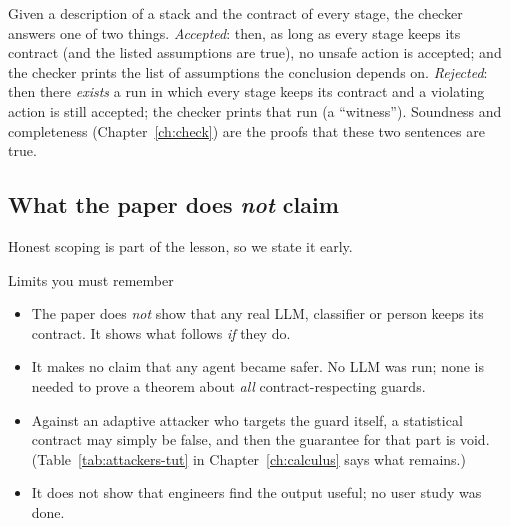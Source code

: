 \begin{center}
\end{center}

Given a description of a stack and the contract of every stage, the checker answers one of two things. \emph{Accepted}: then, as long as every stage keeps its contract (and the listed assumptions are true), no unsafe action is accepted; and the checker prints the list of assumptions the conclusion depends on. \emph{Rejected}: then there \emph{exists} a run in which every stage keeps its contract and a violating action is still accepted; the checker prints that run (a ``witness''). Soundness and completeness (Chapter~\ref{ch:check}) are the proofs that these two sentences are true.

\subsection{What the paper does \emph{not} claim}

Honest scoping is part of the lesson, so we state it early.

\begin{warning}{Limits you must remember}
\begin{itemize}
\item The paper does \emph{not} show that any real LLM, classifier or person keeps its contract. It shows what follows \emph{if} they do.
\item It makes no claim that any agent became safer. No LLM was run; none is needed to prove a theorem about \emph{all} contract-respecting guards.
\item Against an adaptive attacker who targets the guard itself, a statistical contract may simply be false, and then the guarantee for that part is void. (Table~\ref{tab:attackers-tut} in Chapter~\ref{ch:calculus} says what remains.)
\item It does not show that engineers find the output useful; no user study was done.
\end{itemize}
\end{warning}

